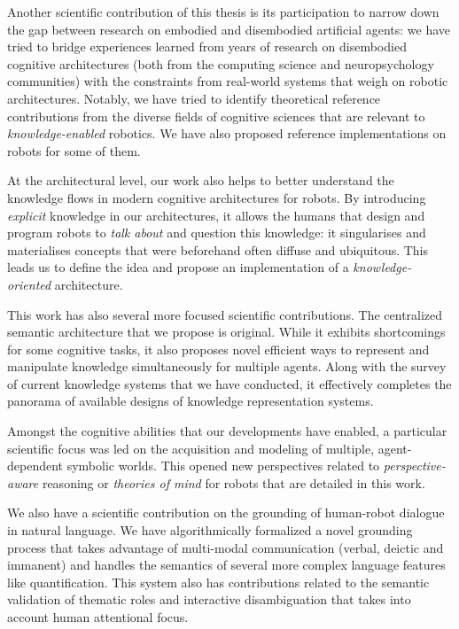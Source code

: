 Another scientific contribution of this thesis is its participation to
narrow down the gap between research on embodied and disembodied artificial
agents: we have tried to bridge experiences learned from years of research on
disembodied cognitive architectures (both from the computing science and
neuropsychology communities) with the constraints from real-world systems that
weigh on robotic architectures. Notably, we have tried to identify
theoretical reference contributions from the diverse fields of cognitive
sciences that are relevant to \emph{knowledge-enabled} robotics. We have also
proposed reference implementations on robots for some of them.

At the architectural level, our work also helps to better understand the
knowledge flows in modern cognitive architectures for robots. By introducing
\emph{explicit} knowledge in our architectures, it allows the humans that
design and program robots to \emph{talk about} and question this knowledge: it
singularises and materialises concepts that were beforehand often
diffuse and ubiquitous. This leads us to define the idea and propose an
implementation of a \emph{knowledge-oriented} architecture.

This work has also several more focused scientific contributions. The
centralized semantic architecture that we propose is original. While it
exhibits shortcomings for some cognitive tasks, it also proposes novel efficient
ways to represent and manipulate knowledge simultaneously for multiple agents.
Along with the survey of current knowledge systems that we have conducted,
it effectively completes the panorama of available designs of knowledge
representation systems.

Amongst the cognitive abilities that our developments have enabled, a
particular scientific focus was led on the acquisition and modeling of
multiple, agent-dependent symbolic worlds. This opened new perspectives related
to \emph{perspective-aware} reasoning or \emph{theories of mind} for robots
that are detailed in this work.

We also have a scientific contribution on the grounding of human-robot
dialogue in natural language. We have algorithmically formalized a novel
grounding process that takes advantage of multi-modal communication (verbal,
deictic and immanent) and handles the semantics of several more complex
language features like quantification. This system also has contributions
related to the semantic validation of thematic roles and interactive
disambiguation that takes into account human attentional focus.

